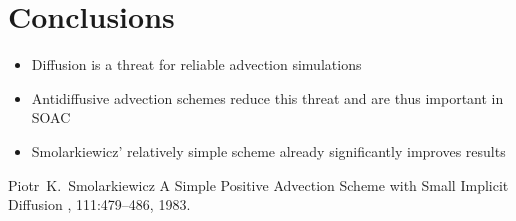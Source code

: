 \documentclass[hyperref={pdfstartview=Fit,pdfpagemode=FullScreen}]{beamer}
\newcommand{\imsize}{}
\begin{document}
\section{Conclusions}
\begin{frame}
\begin{itemize}
\frametitle{Conclusions}
\item Diffusion is a threat for reliable advection simulations
\item Antidiffusive advection schemes reduce this threat and are thus important in SOAC
\item Smolarkiewicz' relatively simple scheme already significantly improves results
\end{itemize}

\begin{thebibliography}{10}
      
  \beamertemplatearticlebibitems

    Piotr~K.~Smolarkiewicz
    \newblock A Simple Positive Advection Scheme with Small Implicit Diffusion
    , 111:479--486,
    1983.
  \end{thebibliography}
\end{frame}



\end{document}

